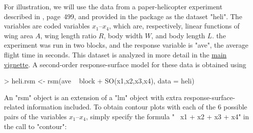 \documentclass[article,nojss]{jss}
\def\rsm{\pkg{rsm}}
\begin{document}
For illustration, we will use the data from a paper-helicopter experiment described in \cite{Box05}, page~499, and provided in the \rsm{} package as the dataset "heli".  The variables are coded variables $x_1$--$x_4$, which are, respectively, linear functions of wing area $A$, wing length ratio $R$, body width $W$, and body length $L$.  the experiment was run in two blocks, and the response variable is "ave", the average flight time in seconds.  This dataset is analyzed in more detail in  the \href{rsm.pdf}{main \rsm{} vignette}.  A second-order response-surface model for these data is obtained using
\begin{Schunk}
\begin{Sinput}
> heli.rsm <- rsm(ave ~ block + SO(x1,x2,x3,x4), data = heli)
\end{Sinput}
\end{Schunk}
An "rsm" object is an extension of a "lm" object with extra response-surface-related information included.
To obtain contour plots with each of the 6 possible pairs of the variables $x_1$--$x_4$, simply specify the formula "~ x1 + x2 + x3 + x4" in the call to "contour":
\end{document}
